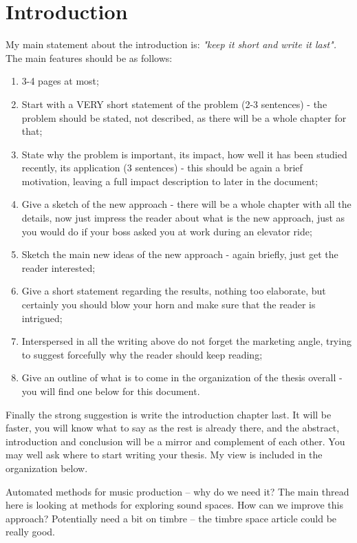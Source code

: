 \chapter{Introduction}

My main statement about the introduction is:
\textit{"keep it short and write it last".} The main features should be as follows:
\begin{enumerate}
\item {3-4 pages at most;}
\item {Start with a VERY short statement of the problem (2-3 sentences) - the problem should be stated, not described, as there will be a whole chapter for that;}
\item {State why the problem is important, its impact, how well it has been studied recently, its application (3 sentences) - this should be again a brief motivation, leaving a full impact description to later in the document;}
\item {Give a sketch of the new approach - there will be a whole chapter with all the details, now just impress the reader about what is the new approach, just as you would do if your boss asked you at work during an elevator ride;}
\item {Sketch the main new ideas of the new approach - again briefly, just get the reader interested;}
\item {Give a short statement regarding the results, nothing too elaborate, but certainly you should blow your horn and make sure that the reader is intrigued;}
\item {Interspersed in all the writing above do not forget the marketing angle, trying to suggest forcefully why the reader should keep reading;}
\item {Give an outline of what is to come in the organization of the thesis overall - you will find one below for this document.}

\end{enumerate}

Finally the strong suggestion is write the introduction chapter last. It will be faster, you will know what to say as the rest is already there, and the abstract, introduction and conclusion will be a mirror and complement of each other. You may well ask where to start writing your thesis. My view is included in the organization below.


Automated methods for music production -- why do we need it? The main thread here is looking at methods for exploring sound spaces. How can we improve this approach? Potentially need a bit on timbre -- the timbre space article could be really good.


